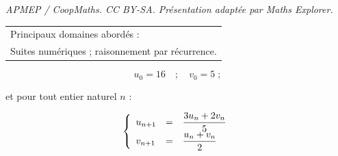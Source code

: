 \documentclass[10pt]{article}
\begin{document}
\noindent\textit{APMEP / CoopMaths. CC BY-SA. Présentation adaptée par Maths Explorer.}\par\medskip
\medskip

\begin{tabular}{|l|}\hline
Principaux domaines abordés :\\
Suites numériques ; raisonnement par récurrence.\\ \hline
\end{tabular}

\medskip



\[u_0 = 16 \quad ;\quad  v_0 = 5 \;;\]

et pour tout entier naturel $n$ :

\renewcommand\arraystretch{2}
\[\left\{\begin{array}{l c l}
u_{n+1}&=&\dfrac{3u_n + 2v_n}{5}\\
v_{n+1}&=& \dfrac{u_n + v_n}{2}
\end{array}\right.\]
\renewcommand\arraystretch{1}

\smallskip
\end{document}
